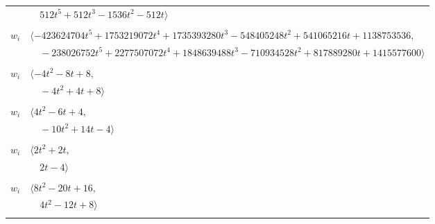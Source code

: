 \documentclass[11pt]{article}
\begin{document}
\begin{longtable}{@{}ll@{}}
 & $\quad 512t^{5}+512t^{3}-1536t^{2}-512t\rangle$\\
\addlinespace[2pt]
\multicolumn{2}{@{}p{0.97\textwidth}@{}}{$i=17$, $D_i=1048576$, $\rho_{ij}$: $1{:}1, \allowbreak 2{:}2, \allowbreak 3{:}2, \allowbreak 5{:}1, \allowbreak 9{:}2, \allowbreak 10{:}2, \allowbreak 11{:}1, \allowbreak 12{:}1, \allowbreak 16{:}1, \allowbreak 20{:}2, \allowbreak 21{:}2, \allowbreak 22{:}2, \allowbreak 32{:}2, \allowbreak 40{:}1, \allowbreak 43{:}2, \allowbreak 45{:}1, \allowbreak 47{:}2, \allowbreak 48{:}2$}\\
$w_i$ & $\langle -423624704t^{5}+1753219072t^{4}+1735393280t^{3}-548405248t^{2}+541065216t+1138753536,$\\
 & $\quad -238026752t^{5}+2277507072t^{4}+1848639488t^{3}-710934528t^{2}+817889280t+1415577600\rangle$\\
\addlinespace[2pt]
\multicolumn{2}{@{}p{0.97\textwidth}@{}}{$i=18$, $D_i=4$, $\rho_{ij}$: $3{:}1, \allowbreak 8{:}1, \allowbreak 9{:}2, \allowbreak 16{:}2, \allowbreak 29{:}1, \allowbreak 42{:}1$}\\
$w_i$ & $\langle -4t^{2}-8t+8,$\\
 & $\quad -4t^{2}+4t+8\rangle$\\
\addlinespace[2pt]
\multicolumn{2}{@{}p{0.97\textwidth}@{}}{$i=19$, $D_i=2$, $\rho_{ij}$: $0{:}2, \allowbreak 1{:}1, \allowbreak 2{:}2, \allowbreak 3{:}1, \allowbreak 11{:}1, \allowbreak 25{:}1, \allowbreak 29{:}2, \allowbreak 30{:}2, \allowbreak 34{:}1, \allowbreak 42{:}1$}\\
$w_i$ & $\langle 4t^{2}-6t+4,$\\
 & $\quad -10t^{2}+14t-4\rangle$\\
\addlinespace[2pt]
\multicolumn{2}{@{}p{0.97\textwidth}@{}}{$i=20$, $D_i=2$, $\rho_{ij}$: $1{:}2, \allowbreak 9{:}2, \allowbreak 14{:}2, \allowbreak 17{:}1, \allowbreak 29{:}1$}\\
$w_i$ & $\langle 2t^{2}+2t,$\\
 & $\quad 2t-4\rangle$\\
\addlinespace[2pt]
\multicolumn{2}{@{}p{0.97\textwidth}@{}}{$i=21$, $D_i=4$, $\rho_{ij}$: $0{:}2, \allowbreak 7{:}2, \allowbreak 13{:}1, \allowbreak 17{:}1, \allowbreak 23{:}2, \allowbreak 39{:}2, \allowbreak 43{:}1$}\\
$w_i$ & $\langle 8t^{2}-20t+16,$\\
 & $\quad 4t^{2}-12t+8\rangle$\\
\addlinespace[2pt]
\multicolumn{2}{@{}p{0.97\textwidth}@{}}{$i=22$, $D_i=2$, $\rho_{ij}$: $4{:}2, \allowbreak 17{:}1, \allowbreak 35{:}1, \allowbreak 36{:}2, \allowbreak 44{:}1$}\\

\end{longtable}
\end{document}
